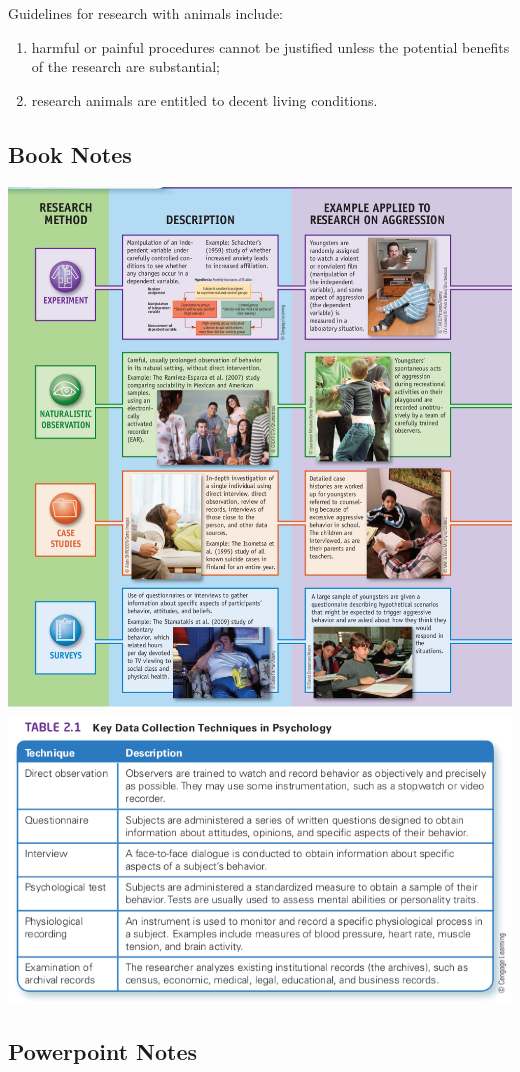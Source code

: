 \documentclass{article}
\begin{document}
\begin{description}
    Guidelines for research with animals include:
    \begin{enumerate}
        \item harmful or painful procedures cannot be justified unless the potential benefits of the research are substantial;
        \item research animals are entitled to decent living conditions.
    \end{enumerate}
\end{description}

\subsection{Book Notes}
\includegraphics[width=\textwidth]{methods}
\includegraphics[width=\textwidth]{data_collection}

\subsection{Powerpoint Notes}

\end{document}
